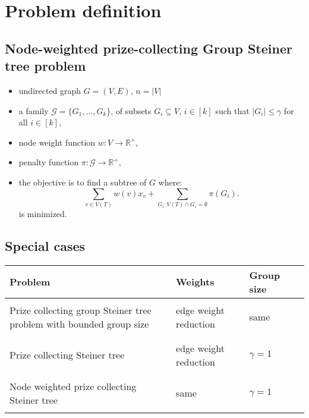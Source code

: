 \documentclass{beamer}
\begin{document}
\section{Problem definition}
\subsection*{Node-weighted prize-collecting Group Steiner tree problem}
\begin{frame}{\insertsection}{\insertsubsection}
    \begin{block}{}
        \begin{itemize}[<+->]
            \item undirected graph $G=\left(V,E\right)$, $n=|V|$
            \item a family $\mathcal{G}=\{G_1,\ldots,G_k\}$, of subsets $G_i\subseteq V$, $i\in\left[k\right]$ such that $\left|G_i\right|\leq\gamma$ for all $i\in\left[k\right]$, 
            \item node weight function $w:V\rightarrow\mathbb{R}^+$,
            \item penalty function $\pi:\mathcal{G}\rightarrow\mathbb{R}^+$,
            \item the objective is to find a subtree of $G$ where:
            $$\sum_{v\in V(T)}w(v)x_v+\sum_{G_i:V(T)\cap G_i=\emptyset}\pi(G_i).$$
            is minimized.
            
        \end{itemize}
        
    \end{block}
\end{frame}

\subsection*{Special cases}
\begin{frame}{\insertsection}{\insertsubsection}
    \begin{block}{}
        \begin{tabular}{|p{}|p{}|p{}|p{}|}
            \hline
            Problem&Weights&Group size\\ \hline\hline
            &&\\ 
            Prize collecting group Steiner tree problem with bounded group size& edge weight reduction &same\\ &&\\ \hline 
            &&\\
            Prize collecting Steiner tree & edge weight reduction & $\gamma = 1$ \\
            &&\\ \hline 
            &&\\
            Node weighted prize collecting Steiner tree & same & $\gamma = 1$\\
            &&\\ \hline
        \end{tabular}
    \end{block}
\end{frame}
\end{document}

